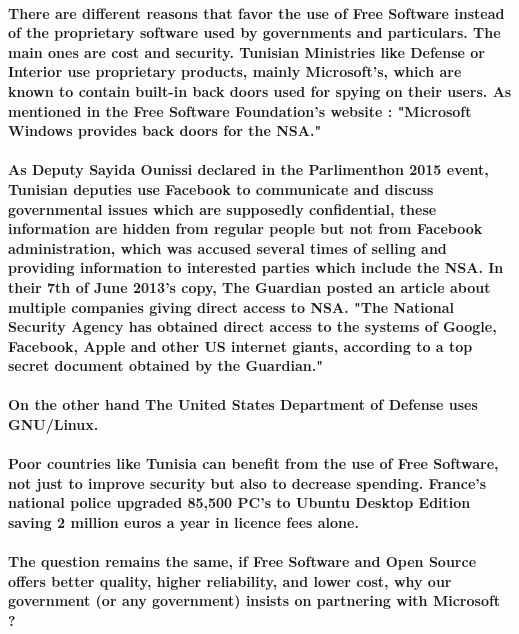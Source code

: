 
\newpage
\vspace{1cm}
 
\NewsItem{\textcolor[rgb]{0.55,0,0}{\huge Free Software in Tunisian Government}}

\paragraph*{There are different reasons that favor the use of Free Software instead of the proprietary software used by governments and particulars. The main ones are cost and security.
Tunisian Ministries like Defense or Interior use proprietary products, mainly Microsoft's, which are known to contain built-in back doors used for spying on their users. As mentioned in the Free Software Foundation's website : "Microsoft Windows provides back doors for the NSA."}
\paragraph*{As Deputy Sayida Ounissi declared in the Parlimenthon 2015 event, Tunisian deputies use Facebook to communicate and discuss governmental issues which are supposedly confidential, these information are hidden from regular people but not from Facebook administration, which was accused several times of selling and providing information to interested parties which include the NSA. In their 7th of June 2013's copy, The Guardian posted an article about multiple companies giving direct access to NSA. "The National Security Agency has obtained direct access to the systems of Google, Facebook, Apple and other US internet giants, according to a top secret document obtained by the Guardian."}
\paragraph*{On the other hand The United States Department of Defense uses GNU/Linux.}
\paragraph*{Poor countries like Tunisia can benefit from the use of Free Software, not just to improve security but also to decrease spending.
France's national police upgraded 85,500 PC's to Ubuntu Desktop Edition saving 2 million euros a year in licence fees alone.}
\paragraph*{The question remains the same, if Free Software and Open Source offers better quality, higher reliability, and lower cost, why our government (or any government) insists on partnering with Microsoft ?\\}

